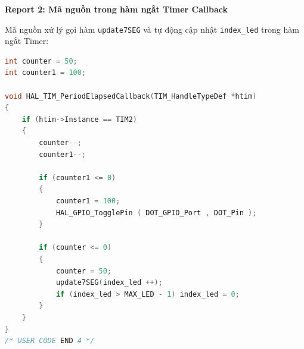 \vspace{0.3cm}

\textbf{Report 2: Mã nguồn trong hàm ngắt Timer Callback}

Mã nguồn xử lý gọi hàm \texttt{update7SEG} và tự động cập nhật \texttt{index\_led} trong hàm ngắt Timer:

\begin{lstlisting}[language=C, caption={Xử lý quét LED 7 đoạn trong hàm ngắt Timer Callback}, label={lst:lab2_ex3_callback}]
int counter = 50;
int counter1 = 100;

void HAL_TIM_PeriodElapsedCallback(TIM_HandleTypeDef *htim)
{
    if (htim->Instance == TIM2)
    {
        counter--;
        counter1--;

        if (counter1 <= 0)
        {
            counter1 = 100;
            HAL_GPIO_TogglePin ( DOT_GPIO_Port , DOT_Pin );
        }

        if (counter <= 0)
        {
            counter = 50;
            update7SEG(index_led ++);
            if (index_led > MAX_LED - 1) index_led = 0;
        }
    }
}
/* USER CODE END 4 */
\end{lstlisting}